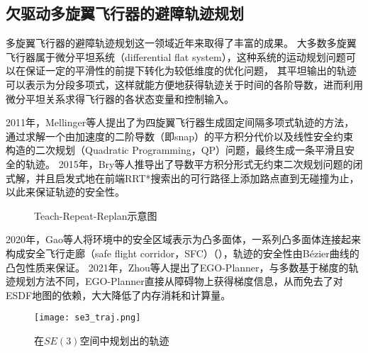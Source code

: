 \subsection{欠驱动多旋翼飞行器的避障轨迹规划}
多旋翼飞行器的避障轨迹规划这一领域近年来取得了丰富的成果。
大多数多旋翼飞行器属于微分平坦系统（differential flat system）\cite{2003Flatness}，这种系统的运动规划问题可以在保证一定的平滑性的前提下转化为较低维度的优化问题，
其平坦输出的轨迹可以表示为分段多项式，这样就能方便地获得轨迹关于时间的各阶导数，进而利用微分平坦关系求得飞行器的各状态变量和控制输入。

2011年，Mellinger等人提出了为四旋翼飞行器生成固定间隔多项式轨迹的方法\cite{2011minimumsnap}，通过求解一个由加速度的二阶导数（即snap）的平方积分代价以及线性安全约束构造的二次规划（Quadratic Programming，QP）问题，最终生成一条平滑且安全的轨迹。
2015年，Bry等人推导出了导数平方积分形式无约束二次规划问题的闭式解\cite{bry2015aggressive}，并且启发式地在前端RRT*搜索出的可行路径上添加路点直到无碰撞为止，以此来保证轨迹的安全性。
\begin{figure}[!ht]
    \setlength{\subfigcapskip}{-1bp}
    \centering
    \begin{minipage}{\textwidth}

    \centering
    \subfigure{\label{fig:ttr_corridor}}\addtocounter{subfigure}{-2}
    \hspace{0.2em}
    \subfigure{\label{fig:ttr_trajectory}}\addtocounter{subfigure}{-2}
    
    \end{minipage}
    \caption{Teach-Repeat-Replan示意图\cite{gao2020teach}}
    \label{fig:TTR}
\end{figure}
2020年，Gao等人将环境中的安全区域表示为凸多面体\cite{gao2020teach}，一系列凸多面体连接起来构成安全飞行走廊（safe flight corridor，SFC）（），轨迹的安全性由B\'{e}zier曲线的凸包性质来保证。
2021年，Zhou等人提出了EGO-Planner，与多数基于梯度的轨迹规划方法不同，EGO-Planner直接从障碍物上获得梯度信息，从而免去了对ESDF地图的依赖，大大降低了内存消耗和计算量。

\begin{figure}[ht]
    \centering
    \texttt{[image: se3\_traj.png]}
    \caption{在$SE(3)$空间中规划出的轨迹\cite{2021Fast}}
    \label{fig:se3_traj}
\end{figure}

